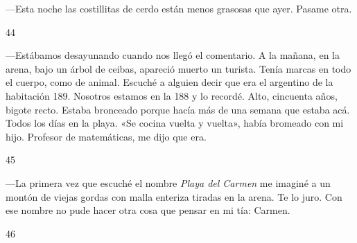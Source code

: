 \documentclass[12pt,twoside,openright,a5paper]{book}
\begin{document}
---Esta noche las costillitas de cerdo están menos grasosas que ayer. Pasame
otra.

\vspace{0.5cm}

\hrulefill \hspace{0.1cm}\decofourleft\hspace{0.2cm} 44 \hspace{0.2cm}\decofourright \hspace{0.1cm}\hrulefill

\nopagebreak

\vspace{0.5cm}

\nopagebreak

---Estábamos desayunando cuando nos llegó el comentario. A la mañana, en la
arena, bajo un árbol de ceibas, apareció muerto un turista. Tenía marcas
en todo el cuerpo, como de animal. Escuché
a alguien decir que era el argentino de la habitación 189. Nosotros estamos
en la 188 y lo recordé. Alto, cincuenta años, bigote recto. Estaba bronceado
porque hacía más de una semana que estaba acá. Todos los días en la
playa. «Se cocina vuelta y vuelta», había bromeado con mi hijo. Profesor de
matemáticas, me dijo que era.

\vspace{0.5cm}

\hrulefill \hspace{0.1cm}\decofourleft\hspace{0.2cm} 45 \hspace{0.2cm}\decofourright \hspace{0.1cm}\hrulefill

\nopagebreak

\vspace{0.5cm}

\nopagebreak

---La primera vez que escuché el nombre \emph{Playa del Carmen} me imaginé a un
montón de viejas gordas con malla enteriza tiradas en la arena. Te lo
juro. Con ese nombre no pude hacer otra cosa que pensar en mi tía: Carmen.

\vspace{0.5cm}

\hrulefill \hspace{0.1cm}\decofourleft\hspace{0.2cm} 46 \hspace{0.2cm}\decofourright \hspace{0.1cm}\hrulefill
\end{document}
